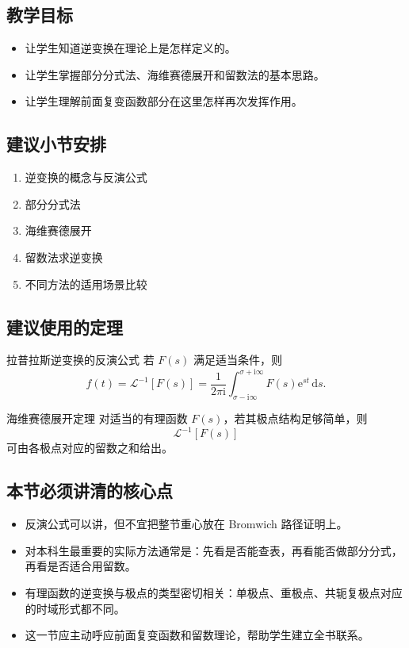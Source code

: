 \subsection*{教学目标}
\begin{itemize}
    \item 让学生知道逆变换在理论上是怎样定义的。
    \item 让学生掌握部分分式法、海维赛德展开和留数法的基本思路。
    \item 让学生理解前面复变函数部分在这里怎样再次发挥作用。
\end{itemize}

\subsection*{建议小节安排}
\begin{enumerate}
    \item 逆变换的概念与反演公式
    \item 部分分式法
    \item 海维赛德展开
    \item 留数法求逆变换
    \item 不同方法的适用场景比较
\end{enumerate}

\subsection*{建议使用的定理}
\begin{dingli}{拉普拉斯逆变换的反演公式}{}
若 $F(s)$ 满足适当条件，则
\[
    f(t)=\mathcal{L}^{-1}[F(s)]
    =
    \frac{1}{2\pi\mathrm{i}}
    \int_{\sigma-\mathrm{i}\infty}^{\sigma+\mathrm{i}\infty}
    F(s)\mathrm{e}^{st}\,\mathrm{d}s.
\]
\end{dingli}

\begin{dingli}{海维赛德展开定理}{}
对适当的有理函数 $F(s)$，若其极点结构足够简单，则
\[
    \mathcal{L}^{-1}[F(s)]
\]
可由各极点对应的留数之和给出。
\end{dingli}

\subsection*{本节必须讲清的核心点}
\begin{itemize}
    \item 反演公式可以讲，但不宜把整节重心放在 Bromwich 路径证明上。
    \item 对本科生最重要的实际方法通常是：先看是否能查表，再看能否做部分分式，再看是否适合用留数。
    \item 有理函数的逆变换与极点的类型密切相关：单极点、重极点、共轭复极点对应的时域形式都不同。
    \item 这一节应主动呼应前面复变函数和留数理论，帮助学生建立全书联系。
\end{itemize}

